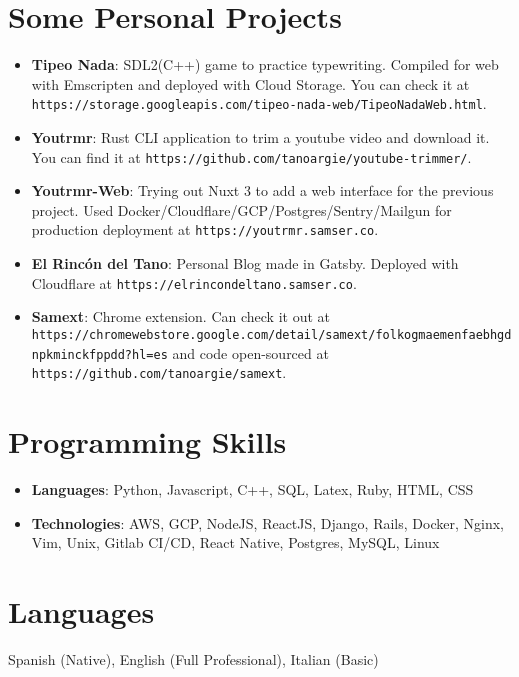 \documentclass[letterpaper,11pt]{article}
\newcommand{\resumeItem}[2]{
  \item\small{
    \textbf{#1}{: #2 \vspace{-2pt}}
  }
}
\newcommand{\resumeSubItem}[2]{\resumeItem{#1}{#2}\vspace{-4pt}}
\newcommand{\resumeSubHeadingListStart}{\begin{itemize}[leftmargin=*]}
\newcommand{\resumeSubHeadingListEnd}{\end{itemize}}
\begin{document}
\section{Some Personal Projects}
 \resumeSubHeadingListStart
   \resumeSubItem{Tipeo Nada}
     {SDL2(C++) game to practice typewriting. Compiled for web with Emscripten and deployed with Cloud Storage. You can check it at \nolinkurl{https://storage.googleapis.com/tipeo-nada-web/TipeoNadaWeb.html}.}
   \resumeSubItem{Youtrmr}
     {Rust CLI application to trim a youtube video and download it. You can find it at \nolinkurl{https://github.com/tanoargie/youtube-trimmer/}.}
   \resumeSubItem{Youtrmr-Web}
     {Trying out Nuxt 3 to add a web interface for the previous project. Used Docker/Cloudflare/GCP/Postgres/Sentry/Mailgun for production deployment at \nolinkurl{https://youtrmr.samser.co}.}
   \resumeSubItem{El Rincón del Tano}
     {Personal Blog made in Gatsby. Deployed with Cloudflare at \nolinkurl{https://elrincondeltano.samser.co}.}
   \resumeSubItem{Samext}
     {Chrome extension. Can check it out at \nolinkurl{https://chromewebstore.google.com/detail/samext/folkogmaemenfaebhgdnpkminckfppdd?hl=es} and code open-sourced at \nolinkurl{https://github.com/tanoargie/samext}.}
 \resumeSubHeadingListEnd


\section{Programming Skills}
  \resumeSubHeadingListStart
    \item{
      \textbf{Languages}{: Python, Javascript, C++, SQL, Latex, Ruby, HTML, CSS}
    }
    \item{
      \textbf{Technologies}{: AWS, GCP, NodeJS, ReactJS, Django, Rails, Docker, Nginx, Vim, Unix, Gitlab CI/CD, React Native, Postgres, MySQL, Linux}
    }
  \resumeSubHeadingListEnd



\section{Languages}
  {Spanish (Native), English (Full Professional), Italian (Basic)}

\end{document}
